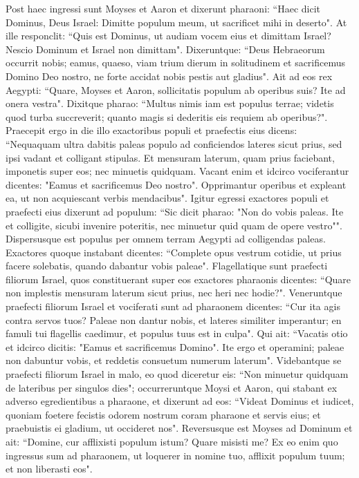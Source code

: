 \begin{biblechapter}  
\verse Post haec ingressi sunt Moyses et Aaron et dixerunt pharaoni: “Haec dicit Dominus, Deus Israel: Dimitte populum meum, ut sacrificet mihi in deserto". 
\verse At ille responclit: “Quis est Dominus, ut audiam vocem eius et dimittam Israel? Nescio Dominum et Israel non dimittam". 
\verse Dixeruntque: “Deus Hebraeorum occurrit nobis; eamus, quaeso, viam trium dierum in solitudinem et sacrificemus Domino Deo nostro, ne forte accidat nobis pestis aut gladius". 
\verse Ait ad eos rex Aegypti: “Quare, Moyses et Aaron, sollicitatis populum ab operibus suis? Ite ad onera vestra". 
\verse Dixitque pharao: “Multus nimis iam est populus terrae; videtis quod turba succreverit; quanto magis si dederitis eis requiem ab operibus?". 
\verse Praecepit ergo in die illo exactoribus populi et praefectis eius dicens: 
\verse “Nequaquam ultra dabitis paleas populo ad conficiendos lateres sicut prius, sed ipsi vadant et colligant stipulas. 
\verse Et mensuram laterum, quam prius faciebant, imponetis super eos; nec minuetis quidquam. Vacant enim et idcirco vociferantur dicentes: "Eamus et sacrificemus Deo nostro". 
\verse Opprimantur operibus et expleant ea, ut non acquiescant verbis mendacibus". 
\verse Igitur egressi exactores populi et praefecti eius dixerunt ad populum: “Sic dicit pharao: "Non do vobis paleas. 
\verse Ite et colligite, sicubi invenire poteritis, nec minuetur quid quam de opere vestro"". 
\verse Dispersusque est populus per omnem terram Aegypti ad colligendas paleas. 
\verse Exactores quoque instabant dicentes: “Complete opus vestrum cotidie, ut prius facere solebatis, quando dabantur vobis paleae". 
\verse Flagellatique sunt praefecti filiorum Israel, quos constituerant super eos exactores pharaonis dicentes: “Quare non implestis mensuram laterum sicut prius, nec heri nec hodie?". 
\verse Veneruntque praefecti filiorum Israel et vociferati sunt ad pharaonem dicentes: “Cur ita agis contra servos tuos? 
\verse Paleae non dantur nobis, et lateres similiter imperantur; en famuli tui flagellis caedimur, et populus tuus est in culpa". 
\verse Qui ait: “Vacatis otio et idcirco dicitis: "Eamus et sacrificemus Domino". 
\verse Ite ergo et operamini; paleae non dabuntur vobis, et reddetis consuetum numerum laterum". 
\verse Videbantque se praefecti filiorum Israel in malo, eo quod diceretur eis: “Non minuetur quidquam de lateribus per singulos dies"; 
\verse occurreruntque Moysi et Aaron, qui stabant ex adverso egredientibus a pharaone, 
\verse et dixerunt ad eos: “Videat Dominus et iudicet, quoniam foetere fecistis odorem nostrum coram pharaone et servis eius; et praebuistis ei gladium, ut occideret nos". 
\verse Reversusque est Moyses ad Dominum et ait: “Domine, cur afflixisti populum istum? Quare misisti me? 
\verse Ex eo enim quo ingressus sum ad pharaonem, ut loquerer in nomine tuo, afflixit populum tuum; et non liberasti eos". 
\end{biblechapter}

